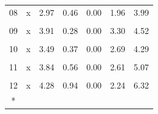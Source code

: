 \begin{longtable}[t]{ccrrrrr}
08 & x & 2.97 & 0.46 & 0.00 & 1.96 & 3.99\\
\cellcolor{gray!10}{09} & \cellcolor{gray!10}{(Intercept)} & \cellcolor{gray!10}{-76975.80} & \cellcolor{gray!10}{15568.48} & \cellcolor{gray!10}{0.00} & \cellcolor{gray!10}{-110896.59} & \cellcolor{gray!10}{-43055.00}\\
09 & x & 3.91 & 0.28 & 0.00 & 3.30 & 4.52\\
\cellcolor{gray!10}{10} & \cellcolor{gray!10}{(Intercept)} & \cellcolor{gray!10}{-38179.03} & \cellcolor{gray!10}{12349.60} & \cellcolor{gray!10}{0.01} & \cellcolor{gray!10}{-65086.50} & \cellcolor{gray!10}{-11271.56}\\
10 & x & 3.49 & 0.37 & 0.00 & 2.69 & 4.29\\
\cellcolor{gray!10}{11} & \cellcolor{gray!10}{(Intercept)} & \cellcolor{gray!10}{-38772.30} & \cellcolor{gray!10}{10775.00} & \cellcolor{gray!10}{0.00} & \cellcolor{gray!10}{-62249.00} & \cellcolor{gray!10}{-15295.60}\\
11 & x & 3.84 & 0.56 & 0.00 & 2.61 & 5.07\\
\cellcolor{gray!10}{12} & \cellcolor{gray!10}{(Intercept)} & \cellcolor{gray!10}{-25919.95} & \cellcolor{gray!10}{9580.12} & \cellcolor{gray!10}{0.02} & \cellcolor{gray!10}{-46793.24} & \cellcolor{gray!10}{-5046.66}\\
12 & x & 4.28 & 0.94 & 0.00 & 2.24 & 6.32\\*
\end{longtable}
